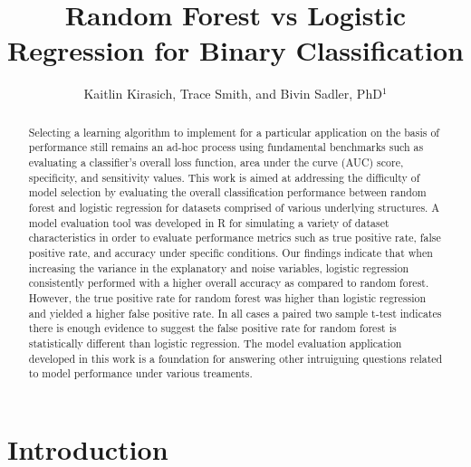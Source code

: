 \documentclass{llncs}
\title{\textbf{Random Forest vs Logistic Regression for Binary Classification}}
\author{Kaitlin Kirasich, Trace Smith, and Bivin Sadler, PhD$^1$}
\institute{$^1$Master of Science in Data Science \\ Southern Methodist University \\ Dallas, Texas USA \\
\email{kkirasich@.smu.edu,traces@smu.edu,bsadler@smu.edu}}
\begin{document}
\maketitle

\begin{abstract} 
Selecting a learning algorithm to implement for a particular application on the basis of performance still remains an ad-hoc process using fundamental benchmarks such as evaluating a classifier’s overall loss function, area under the curve (AUC) score, specificity, and sensitivity values. This work is aimed at addressing the difficulty of model selection by evaluating the overall classification performance between random forest and logistic regression for datasets comprised of various underlying structures. A model evaluation tool was developed in R for simulating a variety of dataset characteristics in order to evaluate performance metrics such as true positive rate, false positive rate, and accuracy under specific conditions. Our findings indicate that when increasing the variance in the explanatory and noise variables, logistic regression consistently performed with a higher overall accuracy as compared to random forest.  However, the true positive rate for random forest was higher than logistic regression and yielded a higher false positive rate. In all cases a paired two sample t-test indicates there is enough evidence to suggest the false positive rate for random forest is statistically different than logistic regression. The model evaluation application developed in this work is a foundation for answering other intruiguing questions related to model performance under various treaments. 

\end{abstract}


\section{Introduction}
\end{document}
